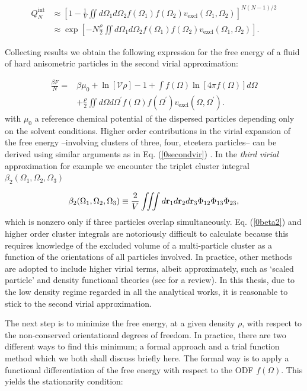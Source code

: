 \begin{align}
Q_{N}^{\text{int}}&\approx \left[1-\frac{1}{V} \iint d\Omega_{1} d\Omega_{2}
f(\Omega_{1})f(\Omega_{2})v_{\text{excl}}(\Omega_{1},\Omega_{2})\right]^{N(N-1)/2} \nonumber \\
&\approx \exp\left[-N \frac{\rho}{2}  \iint d\Omega_{1} d\Omega_{2}
f(\Omega_{1})f(\Omega_{2})v_{\text{excl}}(\Omega_{1},\Omega_{2})  \right].
\end{align}

Collecting results we obtain the following expression for the free energy of a fluid of hard anisometric particles in the second virial approximation:

\begin{align}
\frac{\beta F}{N} =& \beta \mu_{0}+\ln\left[\mathcal{V}\rho\right]-1+
\int f(\Omega)\ln \left[4\pi f(\Omega)\right]d\Omega \nonumber \\
&+\frac{\rho}{2} \iint d\Omega d\Omega^{\prime}
f(\Omega)f(\Omega^{\prime})v_{\text{excl}}(\Omega,\Omega^{\prime}). \label{0freetot}
\end{align}
with $\mu_{0}$ a reference chemical potential of the dispersed particles depending only on the solvent conditions. Higher order contributions in the virial expansion of the free energy --involving clusters of three, four, etcetera particles-- can be derived using similar arguments as in Eq. (\ref{0secondvir}) \cite{vankampen}. In the {\em third virial} approximation for example we encounter the triplet cluster integral $\beta_{2}(\Omega_{1},\Omega_{2},\Omega_{3})$

\begin{equation}
\beta_{2}(\Omega_{1},\Omega_{2},\Omega_{3})\equiv \frac{2}{V}\iiint
d{\bf r}_{1}d{\bf r}_{2}d{\bf r}_{3} \Phi_{12}\Phi_{13}\Phi_{23}, \label{0beta2}
\end{equation}
which is nonzero only if three particles overlap simultaneously. Eq. (\ref{0beta2}) and higher order cluster integrals are notoriously difficult to calculate because this requires knowledge of the excluded volume of a multi-particle cluster as a function of the orientations of all particles involved. In practice, other methods are adopted to include higher virial terms, albeit approximately, such as `scaled particle' \cite{Cotterspt,Cotter} and density functional theories (see \cite{Vroege92,DFTspecialJPCM} for a review). In this thesis, due to the low density regime regarded in all the analytical works, it is reasonable to stick to the second virial approximation.

The next step is to minimize the free energy, at a given density $\rho$, with respect to the non-conserved orientational degrees of freedom. In practice, there are two different ways to find this minimum; a formal approach and a trial function method which we both shall discuss briefly here. The formal way  is to apply a functional differentiation of the free energy with respect to the ODF $f(\Omega)$. This yields the stationarity condition:

